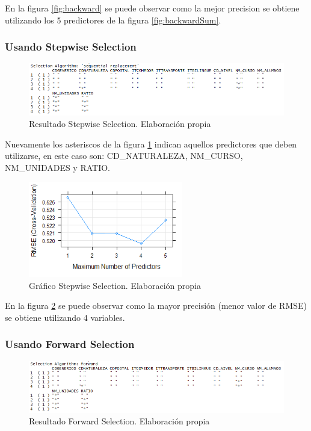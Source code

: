 \begin{subappendices}
En la figura \ref{fig:backward} se puede observar como la mejor precision se obtiene utilizando los 5 predictores de la figura \ref{fig:backwardSum}.

\subsubsection{Usando Stepwise Selection}
\begin{figure}[htb]
	\centering
	\caption{Resultado Stepwise Selection. Elaboración propia}
	\label{fig:seqSum}
	\includegraphics[width=1\textwidth]{recursos/ImagenesR/seqSum}
	
\end{figure}
\FloatBarrier

Nuevamente los asteriscos de la figura \ref{fig:seqSum} indican aquellos predictores que deben utilizarse, en este caso son: CD\_NATURALEZA, NM\_CURSO, NM\_UNIDADES y RATIO.

\begin{figure}[htb]
	\centering
	\caption{Gráfico Stepwise Selection. Elaboración propia}
	\label{fig:seq}
	\includegraphics[width=0.6\textwidth]{recursos/ImagenesR/seq}
	
\end{figure}
\FloatBarrier

En la figura \ref{fig:seq} se puede observar como la mayor precisión (menor valor de RMSE) se obtiene utilizando 4 variables.


\subsubsection{Usando Forward Selection}
\begin{figure}[htb]
	\centering
	\caption{Resultado Forward Selection. Elaboración propia}
	\label{fig:fordwardSum}
	\includegraphics[width=1\textwidth]{recursos/ImagenesR/fordwardSum}
\end{figure}
\FloatBarrier


\end{subappendices}
